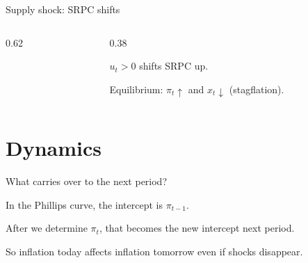 \documentclass[aspectratio=169,xcolor=dvipsnames]{beamer}
\let\tempone\itemize
\let\temptwo\enditemize
\renewenvironment{itemize}{\tempone\addtolength{\itemsep}{\fill}}{\temptwo}
\newcommand{\xpiaxes}[0]{%
  \draw[axis] (-2.6,0) -- (2.8,0) node[below right] {$x_t$ (output gap)};
  \draw[axis] (0,-0.2) -- (0,4.0) node[above left] {$\pi_t$ (inflation)};
  \foreach \xx in {-2,-1,1,2} \draw (\xx,0) -- (\xx,-0.07);
  \foreach \yy in {1,2,3} \draw (0,\yy) -- (-0.07,\yy);
}
\begin{document}
\begin{frame}{Supply shock: SRPC shifts}
\begin{columns}
\begin{column}{0.62\textwidth}
\centering
{}
\end{column}

\begin{column}{0.38\textwidth}
\small
\begin{itemize}
\item $u_t>0$ shifts SRPC up.
\item Equilibrium: $\pi_t\uparrow$ and $x_t\downarrow$ (stagflation).
\end{itemize}
\end{column}
\end{columns}
\end{frame}

\section{Dynamics}

\begin{frame}{What carries over to the next period?}
\begin{itemize}
\item In the Phillips curve, the intercept is $\pi_{t-1}$.
\item After we determine $\pi_t$, that becomes the new intercept next period.
\item So inflation today affects inflation tomorrow even if shocks disappear.
\end{itemize}
\end{frame}
\end{document}
